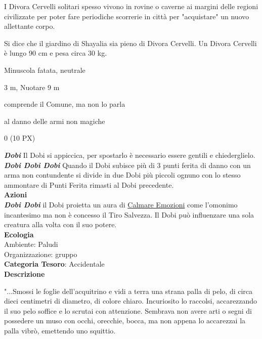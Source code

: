 \begin{multicols}{2}
{I Divora Cervelli solitari spesso vivono in rovine o caverne ai margini delle regioni civilizzate per poter fare periodiche scorrerie in città per "acquistare" un nuovo allettante corpo.

Si dice che il giardino di Shayalia sia pieno di Divora Cervelli. Un Divora Cervelli è lungo 90 cm e pesa circa 30 kg.

\begin{description}[noitemsep, topsep=0pt, parsep=0pt, partopsep=0pt, itemsep=1pt, leftmargin=2.35cm,  labelwidth=2.2cm, itemindent=0cm, listparindent=0pt] %
\setlength{\baselineskip}{10pt}
\item[\textbf{Taglia/Tipo}] Minuscola fatata, neutrale
\item[\textbf{Caratt.}] 
\item[\textbf{Punti Ferita}] 
\item[\textbf{Movimento}] 3 m, Nuotare 9 m
\item[\textbf{Tiri Salvez.}] 
\item[\textbf{Sensi}] 
\item[\textbf{Linguaggi}] comprende il Comune, ma non lo parla
\item[\textbf{Imm. Danni}] al danno delle armi non magiche
\item[\textbf{Sfida}] 0 (10 PX)
\end{description}
\smallskip

\emph{\textbf{Dobi}} Il Dobi si appiccica, per spostarlo è necessario essere gentili e chiederglielo.\\
\emph{\textbf{Dobi Dobi Dobi}} Quando il Dobi subisce più di 3 punti ferita di danno con un arma non contundente si divide in due Dobi più piccoli ognuno con lo stesso ammontare di Punti Ferita rimasti al Dobi precedente.\\
\smallskip\textbf{Azioni}\\
\emph{\textbf{Dobi Dobi}} il Dobi proietta un aura di \hyperlink{Calmare Emozioni}{Calmare Emozioni} come l'omonimo incantesimo ma non è concesso il Tiro Salvezza. Il Dobi può influenzare una sola creatura alla volta con il suo potere.\\
\textbf{Ecologia}\\
Ambiente: Paludi\\
Organizzazione: gruppo\\
\textbf{Categoria Tesoro}: Accidentale\\
\textbf{Descrizione}\\
{\small "...Smossi le foglie dell'acquitrino e vidi a terra una strana palla di pelo, di circa dieci centimetri di diametro, di colore chiaro. Incuriosito lo raccolsi, accarezzando il suo pelo soffice e lo scrutai con attenzione. Sembrava non avere arti o segni di possedere un muso con occhi, orecchie, bocca, ma non appena lo accarezzai la palla vibrò, emettendo uno squittio.

}}
\end{multicols}
